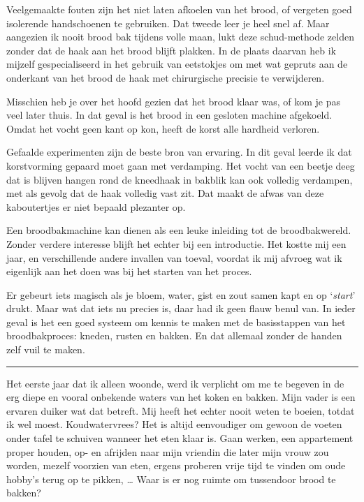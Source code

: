 \documentclass[
  11pt,
  dutch,
]{memoir}
\begin{document}
Veelgemaakte fouten zijn het niet laten afkoelen van het brood, of
vergeten goed isolerende handschoenen te gebruiken. Dat tweede leer je
heel snel af. Maar aangezien ik nooit brood bak tijdens volle maan, lukt
deze schud-methode zelden zonder dat de haak aan het brood blijft
plakken. In de plaats daarvan heb ik mijzelf gespecialiseerd in het
gebruik van eetstokjes om met wat gepruts aan de onderkant van het brood
de haak met chirurgische precisie te verwijderen.

Misschien heb je over het hoofd gezien dat het brood klaar was, of kom
je pas veel later thuis. In dat geval is het brood in een gesloten
machine afgekoeld. Omdat het vocht geen kant op kon, heeft de korst alle
hardheid verloren.

Gefaalde experimenten zijn de beste bron van ervaring. In dit geval
leerde ik dat korstvorming gepaard moet gaan met verdamping. Het vocht
van een beetje deeg dat is blijven hangen rond de kneedhaak in bakblik
kan ook volledig verdampen, met als gevolg dat de haak volledig vast
zit. Dat maakt de afwas van deze kaboutertjes er niet bepaald plezanter
op.

Een broodbakmachine kan dienen als een leuke inleiding tot de
broodbakwereld. Zonder verdere interesse blijft het echter bij een
introductie. Het kostte mij een jaar, en verschillende andere invallen
van toeval, voordat ik mij afvroeg wat ik eigenlijk aan het doen was bij
het starten van het proces.

Er gebeurt iets magisch als je bloem, water, gist en zout samen kapt en
op `\emph{start}' drukt. Maar wat dat iets nu precies is, daar had ik
geen flauw benul van. In ieder geval is het een goed systeem om kennis
te maken met de basisstappen van het broodbakproces: kneden, rusten en
bakken. En dat allemaal zonder de handen zelf vuil te maken.

\pfbreak

Het eerste jaar dat ik alleen woonde, werd ik verplicht om me te begeven
in de erg diepe en vooral onbekende waters van het koken en bakken. Mijn
vader is een ervaren duiker wat dat betreft. Mij heeft het echter nooit
weten te boeien, totdat ik wel moest. Koudwatervrees? Het is altijd
eenvoudiger om gewoon de voeten onder tafel te schuiven wanneer het eten
klaar is. Gaan werken, een appartement proper houden, op- en afrijden
naar mijn vriendin die later mijn vrouw zou worden, mezelf voorzien van
eten, ergens proberen vrije tijd te vinden om oude hobby's terug op te
pikken, \ldots{} Waar is er nog ruimte om tussendoor brood te bakken?
\end{document}

